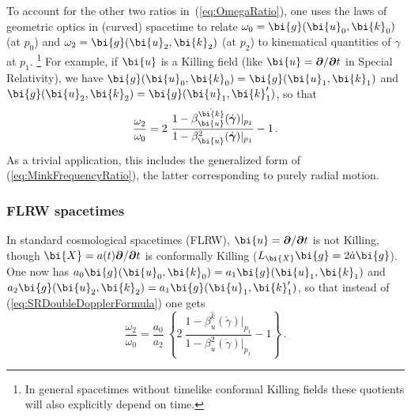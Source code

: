 \documentclass
[rmp,aps,twocolumn,showpacs,preprintnumbers,amsmath,amssymb]{revtex4}
\theoremstyle{plain}
\theoremstyle{definition}
\theoremstyle{remark}
\newcommand{\bpartial}{\boldsymbol{\partial}} %
\newcommand{\g}{\bg}                            %
\newcommand{\gammadot}{{\dot{\bgamma}}}         %
\newcommand{\bg}{\bi{g}}
\newcommand{\bk}{\bi{k}}
\newcommand{\bu}{\bi{u}}
\newcommand{\bX}{\bi{X}}
\newcommand{\bgamma}{\boldsymbol{\gamma}}
\begin{document}
To account for the other two ratios in~(\ref{eq:OmegaRatio}), one 
uses the laws of geometric optics in (curved) spacetime to relate 
$\omega_0=\g(\bu_0,\bk_0)$ (at $p_0$) and $\omega_2=\g(\bu_2,\bk_2)$ 
(at $p_2$) to kinematical quantities of $\gamma$ at $p_1$.%
\footnote{In general spacetimes without timelike conformal 
Killing fields these quotients will also explicitly 
depend on time.} For example, if $\bu$ is a Killing field 
(like $\bu=\bpartial/\bpartial t$ in Special Relativity), we have 
$\g(\bu_0,\bk_0)=\g(\bu_1,\bk_1)$ and $\g(\bu_2,\bk_2)=\g(\bu_1,\bk'_1)$, 
so that  
%
\begin{equation}\label{eq:SRDoubleDopplerFormula}
  \frac{\omega_2}{\omega_0}
  =2\ \frac{1-\beta_\bu^{\hat \bk}(\gammadot)\vert_{p_1}}%
           {1-\beta^2_\bu(\gammadot)\vert_{p_1}} - 1 \,.
\end{equation}
%
As a trivial application, this includes the generalized form 
of (\ref{eq:MinkFrequencyRatio}), the latter corresponding 
to purely radial motion. 


\subsubsection{FLRW spacetimes}
%
In standard cosmological spacetimes (FLRW), $\bu=\bpartial/\bpartial t$ is 
not Killing, though $\bX=a(t)\bpartial/\bpartial t$ is conformally Killing 
($L_\bX \g = 2\dot a\bg$).
One now has $a_0\bg(\bu_0,\bk_0)=a_1\bg(\bu_1,\bk_1)$ and 
$a_2\bg(\bu_2,\bk_2)=a_1\bg(\bu_1,\bk'_1)$, so that instead of 
(\ref{eq:SRDoubleDopplerFormula}) one gets
%
\begin{equation}\label{eq:FLRWDoubleDopplerFormula}
  \frac{\omega_2}{\omega_0}
  = \frac{a_0}{a_2}\ 
  \left\{2\ \frac{1-\beta_u^{\hat k}(\dot\gamma)\vert_{p_1}}%
                 {1-\beta^2_u(\dot\gamma)\vert_{p_1}}-1\right\} \,.
\end{equation}
\end{document}

